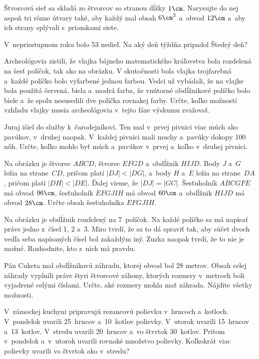 {%
Štvorcová sieť sa skladá zo štvorcov so stranou dĺžky $1\cm$.
Narysujte do nej aspoň tri rôzne útvary také, aby každý mal obsah
$6\cm^2$ a~obvod $12\cm$ a~aby ich strany splývali s~priamkami siete.
}

{%
V~nepriestupnom roku bolo 53 nedieľ. Na aký deň týždňa pripadol Štedrý deň?
}

{%
Archeológovia zistili, že vlajka bájneho matematického kráľovstva bola
rozdelená na šesť políčok, tak ako na obrázku.
V skutočnosti bola vlajka trojfarebná a~každé políčko bolo vyfarbené jednou
farbou.
%
Vedci už vybádali, že na vlajke bola použitá červená, biela a~modrá farba, že
vnútorné obdĺžnikové políčko bolo biele a~že spolu nesusedili dve políčka rovnakej
farby.
Určte, koľko možností vzhľadu vlajky musia archeológovia v~tejto fáze výskumu zvažovať.
}

{%
Juraj išiel do služby k~čarodejníkovi.
Ten mal v~prvej pivnici viac múch ako pavúkov, v~druhej naopak.
V~každej pivnici mali muchy a~pavúky dokopy 100 nôh.
Určte, koľko mohlo byť múch a~pavúkov v~prvej a~koľko v~druhej pivnici.
}

{%
Na obrázku je štvorec $ABCD$, štvorec $EFGD$ a~obdĺžnik $HIJD$.
Body $J$ a~$G$ ležia na strane~$CD$, pričom platí $|DJ|<|DG|$,
a~body $H$ a~$E$ ležia na strane~$DA$, pričom platí $|DH|<|DE|$.
Ďalej vieme, že $|DJ|=|GC|$.
Šesťuholník $ABCGFE$ má obvod $96\cm$, šesťuholník $EFGJIH$ má obvod $60\cm$
a~obdĺžnik $HIJD$ má obvod $28\cm$.
Určte obsah šesťuholníka $EFGJIH$.
%
}

{%
Na obrázku je obdĺžnik rozdelený na 7~políčok.
Na každé políčko sa má napísať práve jedno z~čísel 1, 2 a~3.
%
Miro tvrdí, že sa to dá spraviť tak, aby súčet dvoch vedľa seba napísaných čísel bol zakaždým iný.
Zuzka naopak tvrdí, že to nie je možné.
Rozhodnite, kto z~nich má pravdu.
}

{%
Pán Cuketa mal obdĺžnikovú záhradu, ktorej obvod bol 28 metrov.
Obsah celej záhrady vyplnili práve štyri štvorcové záhony, ktorých rozmery
v~metroch boli vyjadrené celými číslami.
Určte, aké rozmery mohla mať záhrada. Nájdite všetky možnosti.
}

{%
V~zámockej kuchyni pripravujú rezancovú polievku v~hrncoch a~kotloch.
V~pondelok uvarili 25~hrncov a~10~kotlov polievky.
V~utorok uvarili 15~hrncov a~13~kotlov.
V~stredu uvarili 20~hrncov a~vo štvrtok 30~kotlov.
Pritom v~pondelok a~v~utorok uvarili rovnaké množstvo polievky.
Koľkokrát viac polievky uvarili vo štvrtok ako v~stredu?
}

